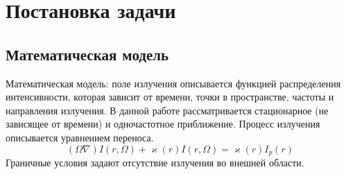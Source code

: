 \chapter{Постановка задачи}

\section{Математическая модель}
Математическая модель: поле излучения описывается функцией
распределения интенсивности, которая зависит от времени, точки в пространстве, частоты и направления излучения. В данной работе рассматривается стационарное (не зависящее от времени) и одночастотное
приближение. Процесс излучения описывается уравнением
переноса. 
\begin {equation}
(\Omega \nabla) I (r, \Omega) + \varkappa (r) I(r, \Omega) = \varkappa (r) I_p (r)
\end {equation}
Граничные условия задают отсутствие излучения во внешней области.